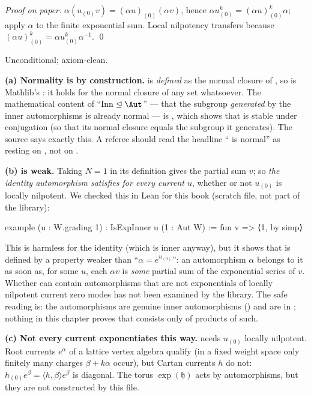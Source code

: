 \emph{Proof on paper.} $\alpha(u_{(0)}v) = (\alpha u)_{(0)}(\alpha v)$, hence
$\alpha u_{(0)}^k = (\alpha u)_{(0)}^k\alpha$; apply $\alpha$ to the finite exponential sum. Local
nilpotency transfers because $(\alpha u)_{(0)}^k = \alpha u_{(0)}^k\alpha^{-1}$. \qed
\begin{status}
Unconditional; axiom-clean.
\end{status}

\begin{warning}[title={Trap / dead end: What the normality of \texttt{Inn} does and does not say}]\label{l04:warn:inn}
\textbf{(a) Normality is by construction.}  is \emph{defined} as the normal closure of
, so  is Mathlib's \allowbreak{}\allowbreak{}: it holds
for the normal closure of any set whatsoever. The mathematical content of ``$\mathrm{Inn}\trianglelefteq
\Aut$'' --- that the subgroup \emph{generated} by the inner automorphisms is already normal --- is
, which shows that  is stable under conjugation (so that its
normal closure equals the subgroup it generates). The source says exactly this. A referee should
read the headline `` is normal'' as resting on , not on
.

\textbf{(b)  is weak.} Taking $N = 1$ in its definition gives the partial sum
$v$; so \emph{the identity automorphism satisfies  for every current $u$},
whether or not $u_{(0)}$ is locally nilpotent. We checked this in Lean for this book (scratch file,
not part of the library):
\begin{plaincode}
example (u : W.grading 1) : IsExpInner u (1 : Aut W) := fun v => ⟨1, by simp⟩
\end{plaincode}
This is harmless for the identity (which is inner anyway), but it shows that  is
defined by a property weaker than ``$\alpha = e^{u_{(0)}}$'': an automorphism $\alpha$ belongs to it as
soon as, for some $u$, each $\alpha v$ is \emph{some} partial sum of the exponential series of $v$.
Whether  can contain automorphisms that are not exponentials of locally nilpotent
current zero modes has not been examined by the library. The safe reading is: the automorphisms
 are genuine inner automorphisms () and are in
; nothing in this chapter proves that  consists only of products of such.

\textbf{(c) Not every current exponentiates this way.}  needs $u_{(0)}$ locally
nilpotent. Root currents $e^\alpha$ of a lattice vertex algebra qualify (in a fixed weight space only
finitely many charges $\beta+k\alpha$ occur), but Cartan currents $h$ do not: $h_{(0)}e^\beta =
\langle h,\beta\rangle e^\beta$ is diagonal. The torus $\exp(\mathfrak h)$ acts by automorphisms, but
they are not constructed by this file.
\end{warning}

